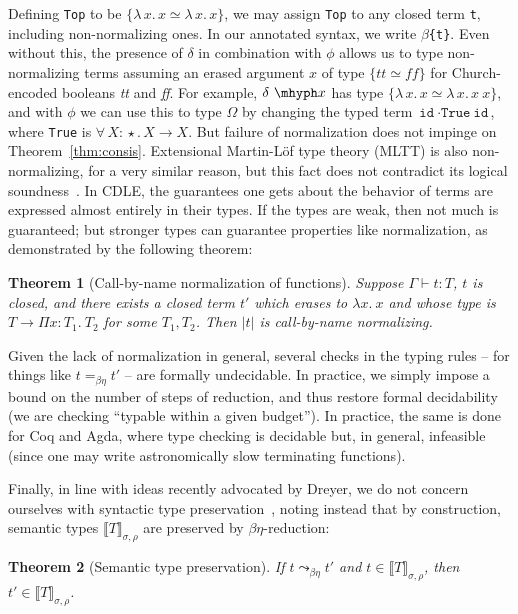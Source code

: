 \documentclass{article}
\newcommand{\abs}[4]{{#1}\, #2\! : \! #3.\, #4}
\newcommand{\absu}[3]{{#1}\, #2.\, #3}
\newcommand{\interp}[1]{\llbracket #1 \rrbracket}
\newtheorem{theorem}{Theorem}
\begin{document}
Defining \verb|Top| to be $\{\absu{\lambda}{x}{x} \simeq
\absu{\lambda}{x}{x}\}$, we may assign \verb|Top| to any closed term \verb|t|,
including non-normalizing ones. In our annotated syntax, we write
\texttt{\(\beta\)\{t\}}. Even without this, the presence of $\delta$ in
combination with $\phi$ allows us to type non-normalizing terms assuming an
erased argument $x$ of type $\{ \textit{tt} \simeq \textit{ff} \}$ for
Church-encoded booleans \textit{tt} and \textit{ff}. For example, $\delta\ \mhyph x$
has type \(\{\absu{\lambda}{x}{x} \simeq \absu{\lambda}{x}{x\ x}\}\), and with
$\phi$ we can use this to type $\Omega$ by changing the typed term
\(\texttt{id}\ \cdot\texttt{True}\ \texttt{id}\), where \verb|True| is
\(\abs{\forall}{X}{\star}{X \to X}\). But failure of normalization does not
impinge on Theorem~\ref{thm:consis}. Extensional Martin-L\"of type theory (MLTT)
is also non-normalizing, for a very similar reason, but this fact does not contradict
its logical soundness~\cite{dybjer16}. In CDLE, the guarantees one gets about
the behavior of terms are expressed almost entirely in their types. If the types
are weak, then not much is guaranteed; but stronger types can guarantee
properties like normalization, as demonstrated by the following theorem:

\begin{theorem}[Call-by-name normalization of functions]
  \label{thm:cedille-termination}
  Suppose \(\Gamma\vdash t : T\), $t$ is closed, and there exists a closed term
  $t'$ which erases to \(\lambda x.\ x\) and whose type is $T \to \Pi x : T_1.\
  T_2$ for some $T_1, T_2$. Then $|t|$ is call-by-name normalizing.
  \end{theorem}

Given the lack of normalization in general, several checks in the typing rules --
for things like $t =_{\beta\eta} t'$ -- are formally undecidable.  In
practice, we simply impose a bound on the number of steps of reduction,
and thus restore formal decidability (we are checking ``typable within
a given budget'').  In practice, the same is done for Coq and Agda,
where type checking is decidable but, in general, infeasible (since one
may write astronomically slow terminating functions).

Finally, in line with ideas recently advocated by Dreyer, we
do not concern ourselves with syntactic
type preservation~\cite{dreyer18}, noting instead that by construction,
semantic types $\interp{T}_{\sigma,\rho}$ are preserved by $\beta\eta$-reduction:

  \begin{theorem}[Semantic type preservation]
    If $t \leadsto_{\beta\eta} t'$ and $t\in\interp{T}_{\sigma,\rho}$, then $t'\in\interp{T}_{\sigma,\rho}$.
    \end{theorem}
\end{document}
